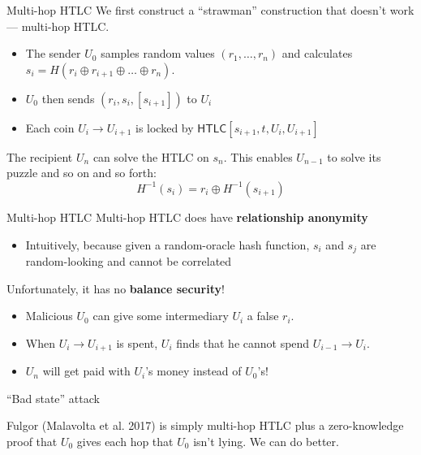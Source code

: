 \documentclass[aspectratio=169]{beamer}
\begin{document}
\begin{frame}{Multi-hop HTLC}
    We first construct a ``strawman'' construction that doesn't work --- multi-hop HTLC.

    \begin{itemize}
        \item The sender $U_0$ samples random values $(r_1,\dots,r_n)$ and calculates $s_i=H(r_i\oplus r_{i+1}\oplus\dots\oplus r_n)$.
        \item $U_0$ then sends $(r_i,s_i,[s_{i+1}])$ to $U_i$
        \item Each coin $U_{i} \rightarrow U_{i+1}$ is locked by $\mathsf{HTLC}[s_{i+1},t,U_i,U_{i+1}]$
    \end{itemize}

    The recipient $U_{n}$ can solve the HTLC on $s_n$. This enables $U_{n-1}$ to solve its puzzle and so on and so forth:
    \[ H^{-1}(s_i) = r_i \oplus H^{-1}(s_{i+1}) \]
\end{frame}

\begin{frame}{Multi-hop HTLC}
    Multi-hop HTLC does have \textbf{relationship anonymity}
    \begin{itemize}
        \item Intuitively, because given a random-oracle hash function, $s_i$ and $s_j$ are random-looking and cannot be correlated
    \end{itemize}

    Unfortunately, it has no \textbf{balance security}!
    \begin{itemize}
        \item Malicious $U_0$ can give some intermediary $U_i$ a false $r_i$.
        \item When $U_i \rightarrow U_{i+1}$ is spent, $U_i$ finds that he cannot spend $U_{i-1} \rightarrow U_i$.
        \item $U_n$ will get paid with $U_i$'s money instead of $U_0$'s!
    \end{itemize}

    ``Bad state'' attack

    Fulgor (Malavolta et al. 2017) is simply multi-hop HTLC plus a zero-knowledge proof that $U_0$ gives each hop that $U_0$ isn't lying. We can do better.
\end{frame}
\end{document}

